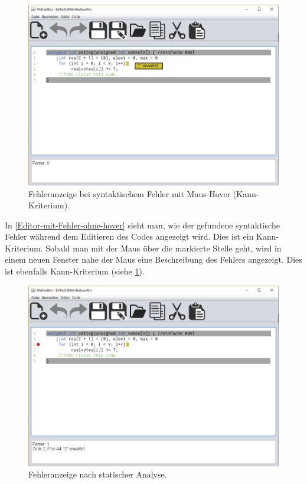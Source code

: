 \documentclass[a4paper]{scrreprt}
\begin{document}
\begin{figure}[H]
\includegraphics[scale=0.4]{Editor-mit-Fehler-mit-hover.png}
\caption{Fehleranzeige bei syntaktischem Fehler mit Maus-Hover (Kann-Kriterium).}
\label{Editor-mit-Fehler-mit-hover}
\end{figure}

In \ref{Editor-mit-Fehler-ohne-hover} sieht man, wie der gefundene syntaktische Fehler während dem Editieren des Codes angezeigt wird. Dies ist ein Kann-Kriterium. Sobald man mit der Maus über die markierte Stelle geht, wird in einem neuen Fenster nahe der Maus eine Beschreibung des Fehlers angezeigt. Dies ist ebenfalls Kann-Kriterium (siehe \ref{Editor-mit-Fehler-mit-hover}).

\begin{figure}[H]
\includegraphics[scale=0.4]{Editor-mit-Fehler-nach-statischer-analyse.png}
\caption{Fehleranzeige nach statischer Analyse.}
\label{Editor-mit-Fehler-nach-statischer-analyse}
\end{figure}
\end{document}
